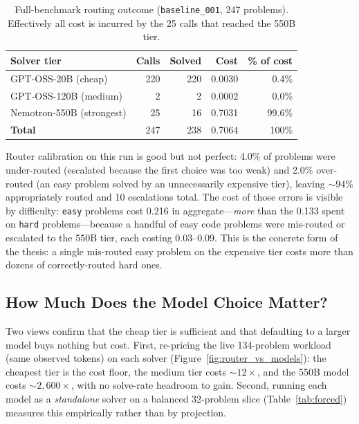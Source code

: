 \documentclass[10pt]{article}
\begin{document}
\begin{table}[ht]
\centering
\small
\begin{tabular}{@{}lrrrr@{}}
\toprule
\textbf{Solver tier} & \textbf{Calls} & \textbf{Solved} & \textbf{Cost} & \textbf{\% of cost} \\
\midrule
GPT-OSS-20B (cheap)     & 220 & 220 & 0.0030 & 0.4\% \\
GPT-OSS-120B (medium)   & 2   & 2   & 0.0002 & 0.0\% \\
Nemotron-550B (strongest) & 25 & 16  & 0.7031 & 99.6\% \\
\midrule
\textbf{Total}          & 247 & 238 & 0.7064 & 100\% \\
\bottomrule
\end{tabular}
\caption{Full-benchmark routing outcome (\texttt{baseline\_001}, 247 problems).
Effectively all cost is incurred by the 25 calls that reached the 550B tier.}
\label{tab:routing-outcome}
\end{table}

Router calibration on this run is good but not perfect: 4.0\% of problems were
under-routed (escalated because the first choice was too weak) and 2.0\% over-routed
(an easy problem solved by an unnecessarily expensive tier), leaving $\sim\!94\%$
appropriately routed and 10 escalations total. The cost of those errors is visible by
difficulty: \texttt{easy} problems cost 0.216 in aggregate---\emph{more} than the 0.133
spent on \texttt{hard} problems---because a handful of easy code problems were
mis-routed or escalated to the 550B tier, each costing 0.03--0.09. This is the concrete
form of the thesis: a single mis-routed easy problem on the expensive tier costs more
than dozens of correctly-routed hard ones.

\subsection{How Much Does the Model Choice Matter?}
\label{sec:modelchoice}
Two views confirm that the cheap tier is sufficient and that defaulting to a larger
model buys nothing but cost. First, re-pricing the live 134-problem workload (same
observed tokens) on each solver (Figure~\ref{fig:router_vs_models}): the cheapest tier
is the cost floor, the medium tier costs $\sim\!12\times$, and the 550B model costs
$\sim\!2{,}600\times$, with no solve-rate headroom to gain. Second, running each model
as a \emph{standalone} solver on a balanced 32-problem slice (Table~\ref{tab:forced})
measures this empirically rather than by projection.
\end{document}
